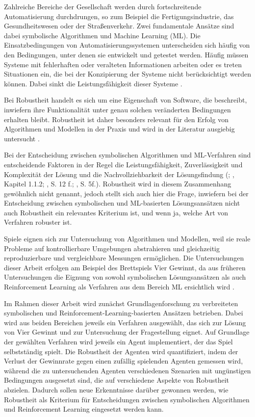 Zahlreiche Bereiche der Gesellschaft werden durch fortschreitende Automatisierung durchdrungen, so zum Beispiel die Fertigungsindustrie, das Gesundheitswesen oder der Straßenverkehr. Zwei fundamentale Ansätze sind dabei symbolische Algorithmen und Machine Learning (ML). Die Einsatzbedingungen von Automatisierungssystemen unterscheiden sich häufig von den Bedingungen, unter denen sie entwickelt und getestet werden. Häufig müssen Systeme mit fehlerhaften oder veralteten Informationen arbeiten oder es treten Situationen ein, die bei der Konzipierung der Systeme nicht berücksichtigt werden können. Dabei sinkt die Leistungsfähigkeit dieser Systeme \cite{Moos.2022}.

Bei Robustheit handelt es sich um eine Eigenschaft von Software, die beschreibt, inwiefern ihre Funktionalität unter genau solchen veränderten Bedingungen erhalten bleibt. Robustheit ist daher besonders relevant für den Erfolg von Algorithmen und Modellen in der Praxis und wird in der Literatur ausgiebig untersucht \cite{Micskei.2012} \cite{Moos.2022} \cite{Ni.2021}.

Bei der Entscheidung zwischen symbolischen Algorithmen und ML-Verfahren sind entscheidende Faktoren in der Regel die Leistungsfähigkeit, Zuverlässigkeit und Komplexität der Lösung und die Nachvollziehbarkeit der Lösungsfindung (\cite{Dabas.2022}; \cite{Ferguson.January2019}, Kapitel 1.1.2; \cite{Humm.2020}, S. 12 f.; \cite{Früh.2022}, S. 5f.). Robustheit wird in diesem Zusammenhang gewöhnlich nicht genannt, jedoch stellt sich auch hier die Frage, inwiefern bei der Entscheidung zwischen symbolischen und ML-basierten Lösungsansätzen nicht auch Robustheit ein relevantes Kriterium ist, und wenn ja, welche Art von Verfahren robuster ist.

Spiele eignen sich zur Untersuchung von Algorithmen und Modellen, weil sie reale Probleme auf kontrollierbare Umgebungen abstrahieren und gleichzeitig reproduzierbare und vergleichbare Messungen ermöglichen. Die Untersuchungen dieser Arbeit erfolgen am Beispiel des Brettspiels Vier Gewinnt, da aus früheren Untersuchungen die Eignung von sowohl symbolischen Lösungsansätzen als auch Reinforcement Learning als Verfahren aus dem Bereich ML ersichtlich wird \cite{Qiu.2022} \cite{Sheoran.2022} \cite{Taylor.2024} \cite{Dabas.2022} \cite{Wäldchen.2022}.

Im Rahmen dieser Arbeit wird zunächst Grundlagenforschung zu verbreiteten symbolischen und Reinforcement-Learning-basierten Ansätzen betrieben. Dabei wird aus beiden Bereichen jeweils ein Verfahren ausgewählt, das sich zur Lösung von Vier Gewinnt und zur Untersuchung der Fragestellung eignet. Auf Grundlage der gewählten Verfahren wird jeweils ein Agent implementiert, der das Spiel selbstständig spielt. Die Robustheit der Agenten wird quantifiziert, indem der Verlust der Gewinnrate gegen einen zufällig spielenden Agenten gemessen wird, während die zu untersuchenden Agenten verschiedenen Szenarien mit ungünstigen Bedingungen ausgesetzt sind, die auf verschiedene Aspekte von Robustheit abzielen. Dadurch sollen neue Erkenntnisse darüber gewonnen werden, wie Robustheit als Kriterium für Entscheidungen zwischen symbolischen Algorithmen und Reinforcement Learning eingesetzt werden kann.
